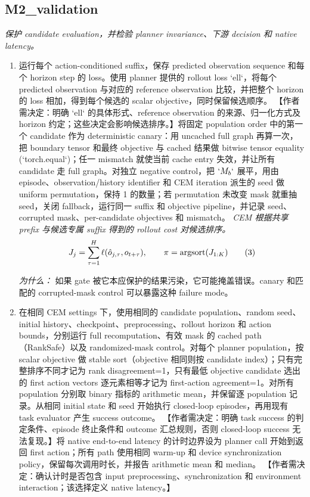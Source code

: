 \documentclass[10pt,a4paper]{article}
\begin{document}
\subsection*{M2\_validation}
\emph{保护 candidate evaluation，并检验 planner invariance、下游 decision 和 native latency。}
\begin{enumerate}[leftmargin=*,start=3]
  \item 运行每个 action-conditioned suffix，保存 predicted observation sequence 和每个 horizon step 的 loss。使用 planner 提供的 rollout loss `ell`，将每个 predicted observation 与对应的 reference observation 比较，并把整个 horizon 的 loss 相加，得到每个候选的 scalar objective，同时保留候选顺序。 【作者需决定：明确 `ell` 的具体形式、reference observation 的来源、归一化方式及 horizon 约定；这些决定会影响候选排序。】将固定 population order 中的第一个 candidate 作为 deterministic canary：用 uncached full graph 再算一次，把 boundary tensor 和最终 objective 与 cached 结果做 bitwise tensor equality (`torch.equal`)；任一 mismatch 就使当前 cache entry 失效，并让所有 candidate 走 full graph。对独立 negative control，把 \(`M_{b}`\) 展平，用由 episode、observation/history identifier 和 CEM iteration 派生的 seed 做 uniform permutation，保持 1 的数量；若 permutation 未改变 mask 就重抽 seed，关闭 fallback，运行同一 suffix 和 objective pipeline，并记录 seed、corrupted mask、per-candidate objectives 和 mismatch。
\noindent\emph{CEM 根据共享 prefix 与候选专属 suffix 得到的 rollout cost 对候选排序。}
\begin{equation}
\resizebox{\ifdim\width>\linewidth \linewidth\else\width\fi}{!}{$\displaystyle J_j = \sum_{\tau=1}^{H} \ell(\hat{o}_{j,\tau}, o_{t+\tau}), \qquad \pi = \operatorname{argsort}(J_{1:K})$} \tag{3}
\end{equation}
\par\emph{为什么：} 如果 gate 被它本应保护的结果污染，它可能掩盖错误。canary 和匹配的 corrupted-mask control 可以暴露这种 failure mode。
  \item 在相同 CEM settings 下，使用相同的 candidate population、random seed、initial history、checkpoint、preprocessing、rollout horizon 和 action bounds，分别运行 full recomputation、有效 mask 的 cached path（RankSafe）以及 randomized-mask control。对每个 planner population，按 scalar objective 做 stable sort（objective 相同则按 candidate index）；只有完整排序不同才记为 rank disagreement=1，只有最低 objective candidate 选出的 first action vectors 逐元素相等才记为 first-action agreement=1。对所有 population 分别取 binary 指标的 arithmetic mean，并保留逐 population 记录。从相同 initial state 和 seed 开始执行 closed-loop episodes，再用现有 task evaluator 产生 success outcome。 【作者需决定：明确 task success 的判定条件、episode 终止条件和 outcome 汇总规则，否则 closed-loop success 无法复现。】将 native end-to-end latency 的计时边界设为 planner call 开始到返回 first action；所有 path 使用相同 warm-up 和 device synchronization policy，保留每次调用时长，并报告 arithmetic mean 和 median。 【作者需决定：确认计时是否包含 input preprocessing、synchronization 和 environment interaction；该选择定义 native latency。】

\end{enumerate}
\end{document}
